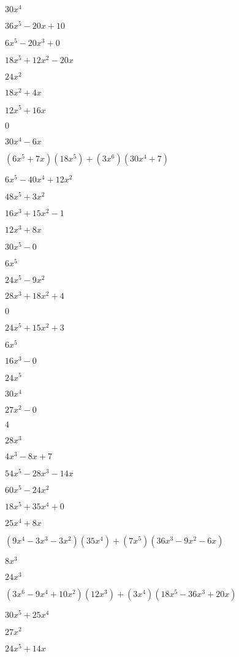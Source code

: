 \documentclass{article}
\begin{document}
\begin{multicols}{2}
$30x^{4}$\item $36x^{5}-20x+10$\item $6x^{5}-20x^{3}+0$\item $18x^{5}+12x^{2}-20x$\item $24x^{2}$\item $18x^{2}+4x$\item $12x^{5}+16x$\item $0$\item $30x^{4}-6x$\item $(6x^{5}+7x)(18x^{5})+(3x^{6})(30x^{4}+7)$\item $6x^{5}-40x^{4}+12x^{2}$\item $48x^{5}+3x^{2}$\item $16x^{3}+15x^{2}-1$\item $12x^{3}+8x$\item $30x^{5}-0$\item $6x^{5}$\item $24x^{5}-9x^{2}$\item $28x^{3}+18x^{2}+4$\item $0$\item $24x^{5}+15x^{2}+3$\item $6x^{5}$\item $16x^{3}-0$\item $24x^{5}$\item $30x^{4}$\item $27x^{2}-0$\item $4$\item $28x^{3}$\item $4x^{3}-8x+7$\item $54x^{5}-28x^{3}-14x$\item $60x^{5}-24x^{2}$\item $18x^{5}+35x^{4}+0$\item $25x^{4}+8x$\item $(9x^{4}-3x^{3}-3x^2)(35x^{4})+(7x^{5})(36x^{3}-9x^{2}-6x)$\item $8x^{3}$\item $24x^{3}$\item $(3x^{6}-9x^{4}+10x^2)(12x^{3})+(3x^{4})(18x^{5}-36x^{3}+20x)$\item $30x^{5}+25x^{4}$\item $27x^{2}$\item $24x^{5}+14x$\item 
\end{multicols}
\end{document}
